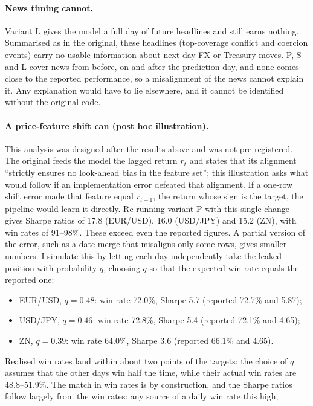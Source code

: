 \documentclass[11pt]{article}
\newcommand{\MSharpeEUR}{17.8}
\newcommand{\MSharpeJPY}{16.0}
\newcommand{\MSharpeZN}{15.2}
\newcommand{\MWinRange}{91--98\%}
\begin{document}
\paragraph{News timing cannot.} Variant L gives the model a full day of future headlines and still earns nothing.
Summarised as in the original, these headlines (top-coverage conflict and coercion events) carry no usable
information about next-day FX or Treasury moves. P, S and L cover news from before, on and after the prediction day,
and none comes close to the reported performance, so a misalignment of the news cannot explain it. Any explanation
would have to lie elsewhere, and it cannot be identified without the original code.

\paragraph{A price-feature shift can (post hoc illustration).} This analysis was designed after the results above
and was not pre-registered. The original feeds the model the lagged return $r_t$ and states that its alignment ``strictly ensures no
look-ahead bias in the feature set''; this illustration asks what would follow if an implementation error defeated
that alignment. If a one-row shift error made that
feature equal $r_{t+1}$, the return whose sign is the target, the pipeline would learn it directly. Re-running variant
P with this single change gives Sharpe ratios of \MSharpeEUR{} (EUR/USD), \MSharpeJPY{} (USD/JPY) and \MSharpeZN{}
(ZN), with win rates of \MWinRange{}. These exceed even the reported figures. A partial version of the error, such as
a date merge that misaligns only some rows, gives smaller numbers. I simulate this by letting each day independently
take the leaked position with probability $q$, choosing $q$ so that the expected win rate equals the reported one:
\begin{itemize}
  \item EUR/USD, $q=0.48$: win rate 72.0\%, Sharpe 5.7 (reported 72.7\% and 5.87);
  \item USD/JPY, $q=0.46$: win rate 72.8\%, Sharpe 5.4 (reported 72.1\% and 4.65);
  \item ZN, $q=0.39$: win rate 64.0\%, Sharpe 3.6 (reported 66.1\% and 4.65).
\end{itemize}
Realised win rates land within about two points of the targets: the choice of $q$ assumes that the other days win
half the time, while their actual win rates are 48.8--51.9\%. The match in win rates is by
construction, and the Sharpe ratios follow largely from the win rates: any source of a daily win rate this high,
\end{document}
